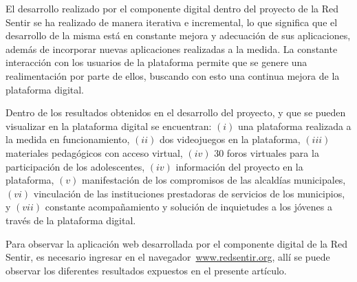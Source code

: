 \documentclass[journal,transmag]{IEEEtran}
\begin{document}
\vspace{4mm}
\vspace{4mm}

El desarrollo realizado por el componente digital dentro del proyecto de la Red Sentir se ha realizado de manera iterativa e incremental, lo que significa que el desarrollo de la misma está en constante mejora y adecuación de sus aplicaciones, además de incorporar nuevas aplicaciones realizadas a la medida. La constante interacción con los usuarios de la plataforma permite que se genere una realimentación por parte de ellos, buscando con esto una continua mejora de la plataforma digital.

Dentro de los resultados obtenidos en el desarrollo del proyecto, y que se pueden visualizar en la plataforma digital se encuentran: $(i)$ una plataforma realizada a la medida en funcionamiento, $(ii)$ dos videojuegos en la plataforma, $(iii)$ materiales pedagógicos con acceso virtual, $(iv)$ $30$ foros virtuales para la participación de los adolescentes, $(iv)$ información del proyecto en la plataforma, $(v)$ manifestación de los compromisos de las alcaldías municipales, $(vi)$ vinculación de las instituciones prestadoras de servicios de los municipios, y $(vii)$ constante acompañamiento y solución de inquietudes a los jóvenes a través de la plataforma digital.

Para observar la aplicación web desarrollada por el componente digital de la Red Sentir, es necesario ingresar en el navegador~\url{www.redsentir.org}, allí se puede observar los diferentes resultados expuestos en el presente artículo.
\end{document}
